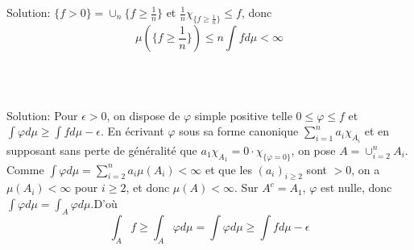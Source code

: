 \documentclass{report}
\begin{document}
Solution: $\{f>0\} = \cup_n \{f\geq \frac 1n \}$ et $\displaystyle \frac 1n \chi_{\{f\geq \frac 1n\}}\leq f$, donc $$\mu(\{f\geq \frac 1n\})\leq n\int f d\mu <\infty $$

\subsection{} \\ \\

Solution: Pour $\epsilon >0$, on dispose de $\varphi$ simple positive telle $0\leq \varphi \leq f$ et \newline
$\int \varphi d\mu \geq \int f d\mu - \epsilon$. En écrivant $\varphi$ sous sa forme canonique $\sum_{i=1}^n a_i \chi_{A_i}$ et en supposant sans perte de généralité que $a_1\chi_{A_1} =0 \cdot \chi_{\{\varphi = 0\}}$, on pose $A = \cup_{i=2}^n A_i$. Comme $\int \varphi d\mu = \sum_{i=2}^n a_i \mu(A_i)<\infty$ et que les $(a_i)_{i\geq 2}$ sont $> 0$, on a $\mu(A_i)<\infty$ pour $i\geq 2$, et donc $\mu(A)<\infty$. \newline
Sur $A^c = A_1$, $\varphi$ est nulle, donc $\int \varphi d\mu  = \int_{A} \varphi d\mu$.\newline  D'où $$\int_A f\geq  \int_A \varphi d\mu = \int \varphi d\mu  \geq \int f d\mu - \epsilon$$ 

\subsection{} \\ \\
\end{document}

